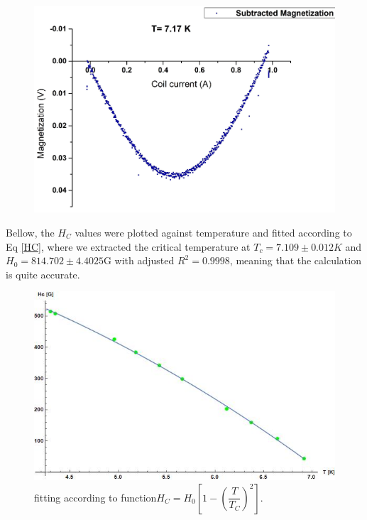 \documentclass[openany,11pt,a4paper]{report}
\begin{document}
\begin{figure}[H]
\begin{center}
\includegraphics[scale=0.15]{717.jpg} 
\end{center}
\end{figure}

Bellow, the $H_{C}$ values were plotted against temperature and fitted according to Eq \ref{HC}, where we extracted the critical temperature at $T_{c}=7.109 \pm 0.012 K$ and $H_{0}= 814.702\pm  4.4025
$G with adjusted $R^{2}=0.9998$, meaning that the calculation is quite accurate.




\begin{figure}[H]
\centering
\caption{fitting according to function$H_{C}=H_{0} [1- (\dfrac{T}{T_{C}})^{2}]$.}
\includegraphics[scale=0.8]{HcT.jpg}
\end{figure}
\end{document}
